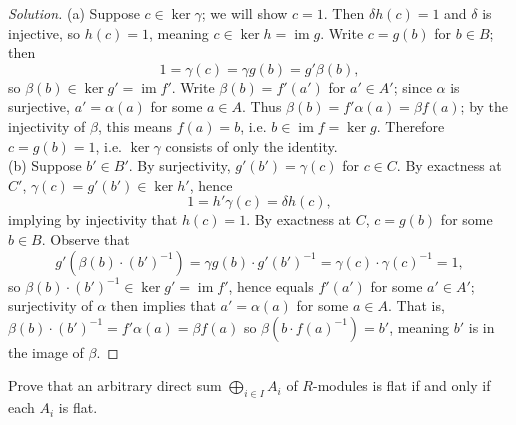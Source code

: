 \documentclass[10pt]{article}
\providecommand{\inv}{^{-1}}
\newenvironment{soln}{\begin{proof}[Solution]}{\end{proof}}
\begin{document}
\begin{soln}
    (a) Suppose $c\in\ker\gamma$; we will show $c=1$.
    Then $\delta h(c) = 1$ and $\delta$ is injective,
    so $h(c) = 1$, meaning $c\in\ker h = \operatorname{im}g$.
    Write $c = g(b)$ for $b\in B$; then
    \begin{equation*}
        1 = \gamma(c) = \gamma g(b) = g'\beta(b),
    \end{equation*}
    so $\beta(b) \in\ker g' = \operatorname{im}f'$.
    Write $\beta(b) = f'(a')$ for $a'\in A'$;
    since $\alpha$ is surjective, $a' = \alpha(a)$ for some $a\in A$.
    Thus $\beta(b) = f'\alpha(a) = \beta f(a)$;
    by the injectivity of $\beta$, this means $f(a) = b$,
    i.e. $b\in\operatorname{im}f = \ker g$.
    Therefore $c = g(b) = 1$, i.e. $\ker\gamma$ consists of
    only the identity.\\

    (b) Suppose $b'\in B'$. By surjectivity,
    $g'(b') = \gamma(c)$ for $c\in C$. By exactness at $C'$,
    $\gamma(c) = g'(b')\in\ker h'$, hence
    \begin{equation*}
        1 = h'\gamma(c) = \delta h(c),
    \end{equation*}
    implying by injectivity that $h(c) = 1$.
    By exactness at $C$, $c = g(b)$ for some $b\in B$. Observe that
    \begin{equation*}
        g'(\beta(b)\cdot(b')\inv)
	= \gamma g(b)\cdot g'(b')\inv
	= \gamma(c)\cdot \gamma(c)\inv = 1,
    \end{equation*}
    so $\beta(b)\cdot (b')\inv\in\ker g' = \operatorname{im}f'$,
    hence equals $f'(a')$ for some $a'\in A'$;
    surjectivity of $\alpha$ then implies that $a' = \alpha(a)$
    for some $a\in A$. That is,
    $\beta(b)\cdot(b')\inv = f'\alpha(a) = \beta f(a)$
    so $\beta(b\cdot f(a)\inv) = b'$,
    meaning $b'$ is in the image of $\beta$.
\end{soln}

\begin{problem}
    [\S10.5\#5]
    Prove that an arbitrary direct sum $\bigoplus_{i\in I}A_i$
    of $R$-modules is flat if and only if each $A_i$ is flat.
\end{problem}
\end{document}
